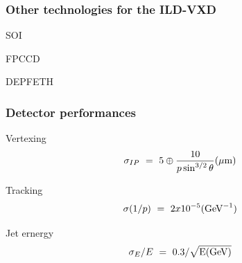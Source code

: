 \documentclass{beamer}
\begin{document}
  \begin{frame}[plain]
    \frametitle{Other technologies for the ILD-VXD}

    \begin{block}{SOI}
    \end{block}

    \begin{block}{FPCCD}
    \end{block}

    \begin{block}{DEPFETH}
    \end{block}
  \end{frame}


  \begin{frame}[plain]
    \frametitle{Detector performances}

    \begin{block}{Vertexing}
      \[ \sigma_{IP} \ = \ 5 \oplus \frac{10}{p\sin^{3/2}\theta} (\mu\rm{m})\]
    \end{block}

    \begin{block}{Tracking}
      \[ \sigma (1/p) \ = \ 2x10^{-5} (\rm{GeV}^{-1})\]
    \end{block}
      
    \begin{block}{Jet ernergy}
      \[\sigma_E / E \ = \ 0.3/\sqrt{\rm{E(GeV)}}\]
    \end{block}

  \end{frame}
 

\end{document}
